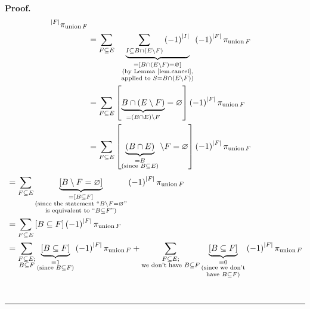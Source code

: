 \documentclass[numbers=enddot,12pt,final,onecolumn,notitlepage]{scrartcl}%
\theoremstyle{definition}
\newenvironment{proof}[1][Proof]{\noindent\textbf{#1.} }{\ \rule{0.5em}{0.5em}}
\newenvironment{verlong}{}{}
\let\sumnonlimits\sum
\renewcommand{\sum}{\sumnonlimits\limits}
\begin{document}
\begin{proof}
\begin{verlong}
\begin{align}
^{\left\vert F\right\vert }\pi_{\operatorname*{union}F}\nonumber\\
&  =\sum_{F\subseteq E}\ \ \underbrace{\sum_{I\subseteq B\cap\left(
E\setminus F\right)  }\left(  -1\right)  ^{\left\vert I\right\vert }%
}_{\substack{=\left[  B\cap\left(  E\setminus F\right)  =\varnothing\right]
\\\text{(by Lemma \ref{lem.cancel},}\\\text{applied to }S=B\cap\left(
E\setminus F\right)  \text{)}}}\left(  -1\right)  ^{\left\vert F\right\vert
}\pi_{\operatorname*{union}F}\nonumber\\
&  =\sum_{F\subseteq E}\left[  \underbrace{B\cap\left(  E\setminus F\right)
}_{=\left(  B\cap E\right)  \setminus F}=\varnothing\right]  \left(
-1\right)  ^{\left\vert F\right\vert }\pi_{\operatorname*{union}F}\nonumber\\
&  =\sum_{F\subseteq E}\left[  \underbrace{\left(  B\cap E\right)
}_{\substack{=B\\\text{(since }B\subseteq E\text{)}}}\setminus F=\varnothing
\right]  \left(  -1\right)  ^{\left\vert F\right\vert }\pi
_{\operatorname*{union}F}\nonumber
\end{align}%
\begin{align*}
&  =\sum_{F\subseteq E}\underbrace{\left[  B\setminus F=\varnothing\right]
}_{\substack{=\left[  B\subseteq F\right]  \\\text{(since the statement
\textquotedblleft}B\setminus F=\varnothing\text{\textquotedblright}\\\text{is
equivalent to \textquotedblleft}B\subseteq F\text{\textquotedblright)}%
}}\left(  -1\right)  ^{\left\vert F\right\vert }\pi_{\operatorname*{union}F}\\
&  =\sum_{F\subseteq E}\left[  B\subseteq F\right]  \left(  -1\right)
^{\left\vert F\right\vert }\pi_{\operatorname*{union}F}\\
&  =\sum_{\substack{F\subseteq E;\\B\subseteq F}}\underbrace{\left[
B\subseteq F\right]  }_{\substack{=1\\\text{(since }B\subseteq F\text{)}%
}}\left(  -1\right)  ^{\left\vert F\right\vert }\pi_{\operatorname*{union}%
F}+\sum_{\substack{F\subseteq E;\\\text{we don't have }B\subseteq
F}}\underbrace{\left[  B\subseteq F\right]  }_{\substack{=0\\\text{(since we
don't}\\\text{have }B\subseteq F\text{)}}}\left(  -1\right)  ^{\left\vert
F\right\vert }\pi_{\operatorname*{union}F}\\

\end{align*}
\end{verlong}
\end{proof}
\end{document}
